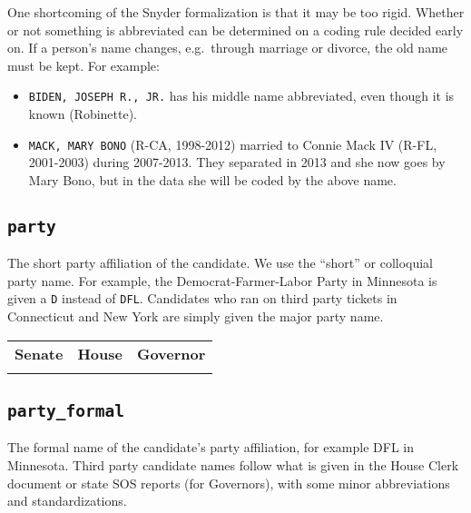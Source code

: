 \documentclass[12pt]{article}
\begin{document}
One shortcoming of the Snyder formalization is that it may be
{too} rigid. Whether or not something is abbreviated can be
determined on a coding rule decided early on. If a person's name
changes, e.g.~through marriage or divorce, the old name must be kept.
For example:

\begin{itemize}
\tightlist
\item
  \texttt{BIDEN,\ JOSEPH\ R.,\ JR.} has his middle name abbreviated,
  even though it is known (Robinette).
\item
  \texttt{MACK,\ MARY\ BONO} (R-CA, 1998-2012) married to Connie Mack IV
  (R-FL, 2001-2003) during 2007-2013. They separated in 2013 and she now
  goes by Mary Bono, but in the data she will be coded by the above
  name.
\end{itemize}


\newpage

\FloatBarrier


\subsection*{\texttt{party}}

The short party affiliation of the candidate. We use the ``short'' or colloquial party name. For example, the Democrat-Farmer-Labor Party in Minnesota is given a \texttt{D} instead of \texttt{DFL}. Candidates who ran on third party tickets in Connecticut and New York are simply given the major party name.
\begin{table}[!h]
\begin{adjustwidth}{-4em}{-4em}
\centering
\begin{tabularx}{\linewidth}{CCC}
\textbf{Senate} & \textbf{House} & \textbf{Governor}\\
   &  &
\end{tabularx}
\end{adjustwidth}
\end{table}


\FloatBarrier

\subsection*{\texttt{party\_formal}}
The formal name of the candidate's party affiliation, for example DFL in Minnesota. Third party candidate names follow what is given in the House Clerk document or state SOS reports (for Governors), with some minor abbreviations and standardizations.
\end{document}
